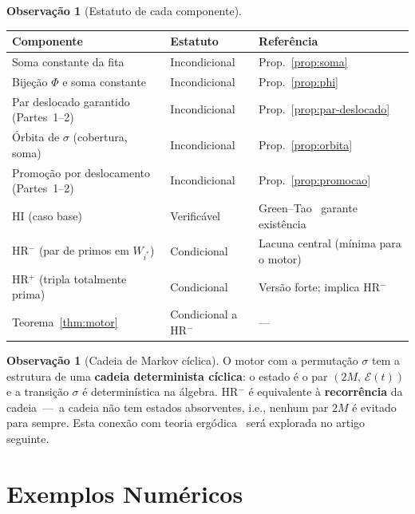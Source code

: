 \documentclass[12pt, a4paper]{article}
\theoremstyle{plain}
\theoremstyle{definition}
\newtheorem{remark}[theorem]{Observação}
\theoremstyle{remark}
\begin{document}
	\begin{remark}[Estatuto de cada componente]
		\label{rem:estatuto}
		\begin{center}
			\begin{tabular}{lll}
				\toprule
				Componente & Estatuto & Referência \\
				\midrule
				Soma constante da fita & Incondicional &
				Prop.~\ref{prop:soma} \\
				Bijeção $\Phi$ e soma constante & Incondicional &
				Prop.~\ref{prop:phi} \\
				Par deslocado garantido (Partes~1--2) & Incondicional &
				Prop.~\ref{prop:par-deslocado} \\
				Órbita de $\sigma$ (cobertura, soma) & Incondicional &
				Prop.~\ref{prop:orbita} \\
				Promoção por deslocamento (Partes~1--2) & Incondicional &
				Prop.~\ref{prop:promocao} \\
				HI (caso base) & Verificável &
				Green--Tao~\cite{green-tao} garante existência \\
				HR$^-$ (par de primos em $W_{i^*}$) & Condicional &
				Lacuna central (mínima para o motor) \\
				HR$^+$ (tripla totalmente prima) & Condicional &
				Versão forte; implica HR$^-$ \\
				Teorema~\ref{thm:motor} & Condicional a HR$^-$ & --- \\
				\bottomrule
			\end{tabular}
		\end{center}
	\end{remark}
	
	\begin{remark}[Cadeia de Markov cíclica]
		O motor com a permutação $\sigma$ tem a estrutura de uma
		\textbf{cadeia determinista cíclica}: o estado é o par
		$(2M,\,\mathcal{E}(t))$ e a transição $\sigma$ é determinística
		na álgebra.  HR$^-$ é equivalente à \textbf{recorrência} da
		cadeia~---~a cadeia não tem estados absorventes, i.e., nenhum
		par $2M$ é evitado para sempre.  Esta conexão com teoria
		ergódica~\cite{grade} será explorada no artigo seguinte.
	\end{remark}
	
	\section{Exemplos Numéricos}
	\label{sec:exemplos}
	
\end{document}
